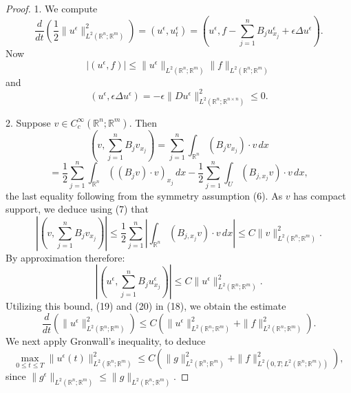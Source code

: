 \begin{proof}
1. We compute
\[
\frac{d}{dt}\left(\frac{1}{2}\|u^\epsilon\|_{L^2(\mathbb{R}^n;\mathbb{R}^m)}^2\right) = (u^\epsilon, u_t^\epsilon) = \left(u^\epsilon, f - \sum_{j=1}^n B_j u_{x_j}^\epsilon + \epsilon \Delta u^\epsilon\right).
\tag{18}
\]
Now
\[
|(u^\epsilon, f)| \leq \|u^\epsilon\|_{L^2(\mathbb{R}^n;\mathbb{R}^m)} \|f\|_{L^2(\mathbb{R}^n;\mathbb{R}^m)}
\tag{19}
\]
and
\[
(u^\epsilon, \epsilon \Delta u^\epsilon) = -\epsilon \|Du^\epsilon\|_{L^2(\mathbb{R}^n;\mathbb{R}^{n \times n})}^2 \leq 0.
\tag{20}
\]

2. Suppose $v \in C_c^\infty(\mathbb{R}^n;\mathbb{R}^m)$. Then
\[
\left(v, \sum_{j=1}^n B_j v_{x_j}\right) = \sum_{j=1}^n \int_{\mathbb{R}^n} (B_j v_{x_j}) \cdot v \, dx
\]
\[
= \frac{1}{2} \sum_{j=1}^n \int_{\mathbb{R}^n} ((B_j v) \cdot v)_{x_j} \, dx - \frac{1}{2} \sum_{j=1}^n \int_U (B_{j,x_j} v) \cdot v \, dx,
\]
the last equality following from the symmetry assumption (6). As $v$ has compact support, we deduce using (7) that
\[
\left|\left(v, \sum_{j=1}^n B_j v_{x_j}\right)\right| \leq \frac{1}{2} \sum_{j=1}^n \left|\int_{\mathbb{R}^n} (B_{j,x_j} v) \cdot v \, dx\right| \leq C\|v\|_{L^2(\mathbb{R}^n;\mathbb{R}^m)}^2.
\]
By approximation therefore:
\[
\left|\left(u^\epsilon, \sum_{j=1}^n B_j u_{x_j}^\epsilon\right)\right| \leq C\|u^\epsilon\|_{L^2(\mathbb{R}^n;\mathbb{R}^m)}^2.
\]
Utilizing this bound, (19) and (20) in (18), we obtain the estimate
\[
\frac{d}{dt}\left(\|u^\epsilon\|^2_{L^2(\mathbb{R}^n;\mathbb{R}^m)}\right) \leq C\left(\|u^\epsilon\|^2_{L^2(\mathbb{R}^n;\mathbb{R}^m)} + \|f\|^2_{L^2(\mathbb{R}^n;\mathbb{R}^m)}\right).
\]
We next apply Gronwall's inequality, to deduce
\[
\max_{0\leq t \leq T} \|u^\epsilon(t)\|^2_{L^2(\mathbb{R}^n;\mathbb{R}^m)} \leq C\left(\|g\|^2_{L^2(\mathbb{R}^n;\mathbb{R}^m)} + \|f\|^2_{L^2(0,T;L^2(\mathbb{R}^n;\mathbb{R}^m))}\right),
\tag{21}
\]
since $\|g^\epsilon\|_{L^2(\mathbb{R}^n;\mathbb{R}^m)} \leq \|g\|_{L^2(\mathbb{R}^n;\mathbb{R}^m)}$.


\end{proof}
